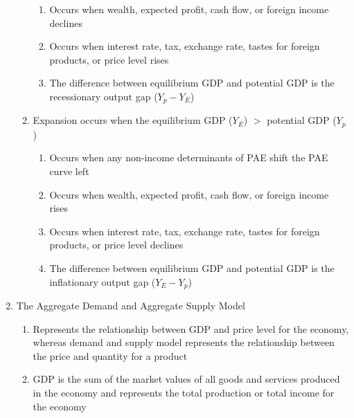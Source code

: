 \documentclass[12pt]{article}
\begin{document}
\begin{enumerate}
\begin{enumerate}
\begin{enumerate}
              \item Occurs when wealth, expected profit, cash flow, or foreign income declines

              \item Occurs when interest rate, tax, exchange rate, tastes for foreign products, or price level rises

              \item The difference between equilibrium GDP and potential GDP is the recessionary output gap ($Y_p-Y_E$)

            \end{enumerate}

          \item Expansion occurs when the equilibrium GDP ($Y_E$) $>$ potential GDP ($Y_p$)

            \begin{enumerate}

              \item Occurs when any non-income determinants of PAE shift the PAE curve left

              \item Occurs when wealth, expected profit, cash flow, or foreign income rises

              \item Occurs when interest rate, tax, exchange rate, tastes for foreign products, or price level declines

              \item The difference between equilibrium GDP and potential GDP is the inflationary output gap ($Y_E-Y_p$)

            \end{enumerate}

        \end{enumerate}

      \item The Aggregate Demand and Aggregate Supply Model

        \begin{enumerate}

          \item Represents the relationship between GDP and price level for the economy, whereas demand and supply model represents the relationship between the price and quantity for a product

          \item GDP is the sum of the market values of all goods and services produced in the economy and represents the total production or total income for the economy


\end{enumerate}
\end{enumerate}
\end{document}
